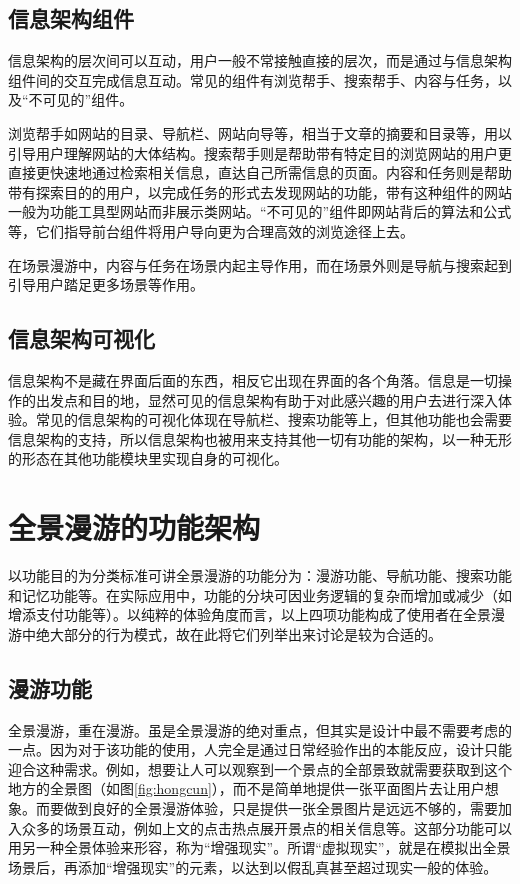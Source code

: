 \subsection{信息架构组件}
信息架构的层次间可以互动，用户一般不常接触直接的层次，而是通过与信息架构组件间的交互完成信息互动。常见的组件有浏览帮手、搜索帮手、内容与任务，以及“不可见的”组件。

浏览帮手如网站的目录、导航栏、网站向导等，相当于文章的摘要和目录等，用以引导用户理解网站的大体结构。搜索帮手则是帮助带有特定目的浏览网站的用户更直接更快速地通过检索相关信息，直达自己所需信息的页面。内容和任务则是帮助带有探索目的的用户，以完成任务的形式去发现网站的功能，带有这种组件的网站一般为功能工具型网站而非展示类网站。“不可见的”组件即网站背后的算法和公式等，它们指导前台组件将用户导向更为合理高效的浏览途径上去。

在场景漫游中，内容与任务在场景内起主导作用，而在场景外则是导航与搜索起到引导用户踏足更多场景等作用。

\subsection{信息架构可视化}
信息架构不是藏在界面后面的东西，相反它出现在界面的各个角落。信息是一切操作的出发点和目的地，显然可见的信息架构有助于对此感兴趣的用户去进行深入体验。常见的信息架构的可视化体现在导航栏、搜索功能等上，但其他功能也会需要信息架构的支持，所以信息架构也被用来支持其他一切有功能的架构，以一种无形的形态在其他功能模块里实现自身的可视化。

\section{全景漫游的功能架构}
以功能目的为分类标准可讲全景漫游的功能分为：漫游功能、导航功能、搜索功能和记忆功能等。在实际应用中，功能的分块可因业务逻辑的复杂而增加或减少（如增添支付功能等）。以纯粹的体验角度而言，以上四项功能构成了使用者在全景漫游中绝大部分的行为模式，故在此将它们列举出来讨论是较为合适的。

\subsection{漫游功能}
全景漫游，重在漫游。虽是全景漫游的绝对重点，但其实是设计中最不需要考虑的一点。因为对于该功能的使用，人完全是通过日常经验作出的本能反应，设计只能迎合这种需求。例如，想要让人可以观察到一个景点的全部景致就需要获取到这个地方的全景图（如图\ref{fig:hongcun}），而不是简单地提供一张平面图片去让用户想象。而要做到良好的全景漫游体验，只是提供一张全景图片是远远不够的，需要加入众多的场景互动，例如上文的点击热点展开景点的相关信息等。这部分功能可以用另一种全景体验来形容，称为“增强现实”。所谓“虚拟现实”，就是在模拟出全景场景后，再添加“增强现实”的元素，以达到以假乱真甚至超过现实一般的体验。

